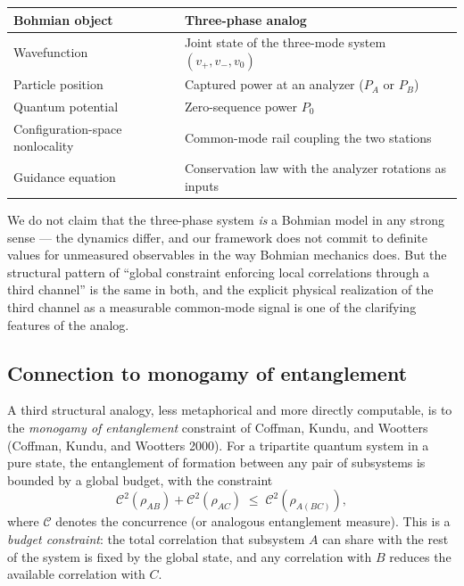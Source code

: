 \documentclass[
  11pt]{article}
\begin{document}
\begin{longtable}[]{@{}
  >{\raggedright\arraybackslash}p{}
  >{\raggedright\arraybackslash}p{}@{}}
\toprule\noalign{}
\begin{minipage}[b]{\linewidth}\raggedright
Bohmian object
\end{minipage} & \begin{minipage}[b]{\linewidth}\raggedright
Three-phase analog
\end{minipage} \\
\midrule\noalign{}
\endhead
\bottomrule\noalign{}
\endlastfoot
Wavefunction & Joint state of the three-mode system
\((v_+, v_-, v_0)\) \\
Particle position & Captured power at an analyzer (\(P_A\) or
\(P_B\)) \\
Quantum potential & Zero-sequence power \(P_0\) \\
Configuration-space nonlocality & Common-mode rail coupling the two
stations \\
Guidance equation & Conservation law with the analyzer rotations as
inputs \\
\end{longtable}

We do not claim that the three-phase system \emph{is} a Bohmian model in
any strong sense --- the dynamics differ, and our framework does not
commit to definite values for unmeasured observables in the way Bohmian
mechanics does. But the structural pattern of ``global constraint
enforcing local correlations through a third channel'' is the same in
both, and the explicit physical realization of the third channel as a
measurable common-mode signal is one of the clarifying features of the
analog.

\subsection{Connection to monogamy of
entanglement}\label{connection-to-monogamy-of-entanglement}

A third structural analogy, less metaphorical and more directly
computable, is to the \emph{monogamy of entanglement} constraint of
Coffman, Kundu, and Wootters (Coffman, Kundu, and Wootters 2000). For a
tripartite quantum system in a pure state, the entanglement of formation
between any pair of subsystems is bounded by a global budget, with the
constraint \[
\mathcal{C}^2(\rho_{AB}) + \mathcal{C}^2(\rho_{AC}) \;\leq\; \mathcal{C}^2(\rho_{A(BC)}),
\] where \(\mathcal{C}\) denotes the concurrence (or analogous
entanglement measure). This is a \emph{budget constraint}: the total
correlation that subsystem \(A\) can share with the rest of the system
is fixed by the global state, and any correlation with \(B\) reduces the
available correlation with \(C\).
\end{document}
